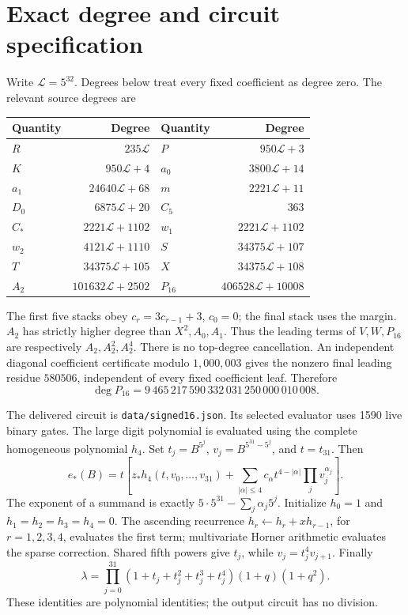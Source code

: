 \documentclass[11pt]{article}
\theoremstyle{remark}\newtheorem{remark}[theorem]{Remark}
\newcommand{\SignedOps}{1590}
\begin{document}
\section{Exact degree and circuit specification}\label{sec:degree}
Write $\mathcal L=5^{32}$. Degrees below treat every fixed coefficient as
degree zero. The relevant source degrees are
\begin{center}\small
\begin{tabular}{lrlr}\toprule
Quantity & Degree & Quantity & Degree\\\midrule
$R$ & $235\mathcal L$ & $P$ & $950\mathcal L+3$\\
$K$ & $950\mathcal L+4$ & $a_0$ & $3800\mathcal L+14$\\
$a_1$ & $24640\mathcal L+68$ & $m$ & $2221\mathcal L+11$\\
$D_0$ & $6875\mathcal L+20$ & $C_5$ & $363$\\
$C_*$ & $2221\mathcal L+1102$ & $w_1$ & $2221\mathcal L+1102$\\
$w_2$ & $4121\mathcal L+1110$ & $S$ & $34375\mathcal L+107$\\
$T$ & $34375\mathcal L+105$ & $X$ & $34375\mathcal L+108$\\
$A_2$ & $101632\mathcal L+2502$ & $P_{16}$ & $406528\mathcal L+10008$\\\bottomrule
\end{tabular}\end{center}
The first five stacks obey $c_r=3c_{r-1}+3$, $c_0=0$; the final stack
uses the margin. $A_2$ has strictly higher degree than $X^2,A_0,A_1$.
Thus the leading terms of $V,W,P_{16}$ are respectively $A_2,A_2^2,A_2^4$.
There is no top-degree cancellation. An independent diagonal coefficient
certificate modulo $1,000,003$ gives the nonzero final leading residue
$580506$, independent of every fixed coefficient leaf. Therefore
\[
 \deg P_{16}=9\,465\,217\,590\,332\,031\,250\,000\,010\,008.
\]

The delivered circuit is \texttt{data/signed16.json}. Its selected evaluator
uses \SignedOps{} live binary gates. The large digit polynomial is evaluated
using the complete homogeneous polynomial $h_4$. Set
$t_j=B^{5^j}$, $v_j=B^{5^{31}-5^j}$, and $t=t_{31}$.
Then
\[
 e_*(B)=t\left[z_*h_4(t,v_0,\ldots,v_{31})+
 \sum_{|\alpha|\le4}c_\alpha t^{4-|\alpha|}\prod_jv_j^{\alpha_j}\right].
\]
The exponent of a summand is exactly
$5\cdot5^{31}-\sum_j\alpha_j5^j$.
Initialize $h_0=1$ and $h_1=h_2=h_3=h_4=0$.
The ascending recurrence $h_r\leftarrow h_r+xh_{r-1}$, for $r=1,2,3,4$,
evaluates the first term; multivariate Horner arithmetic evaluates the sparse
correction. Shared fifth powers give $t_j$, while
$v_j=t_j^4v_{j+1}$. Finally
\[
 \lambda=\prod_{j=0}^{31}(1+t_j+t_j^2+t_j^3+t_j^4)(1+q)(1+q^2).
\]
These identities are polynomial identities; the output circuit has no division.
\end{document}
